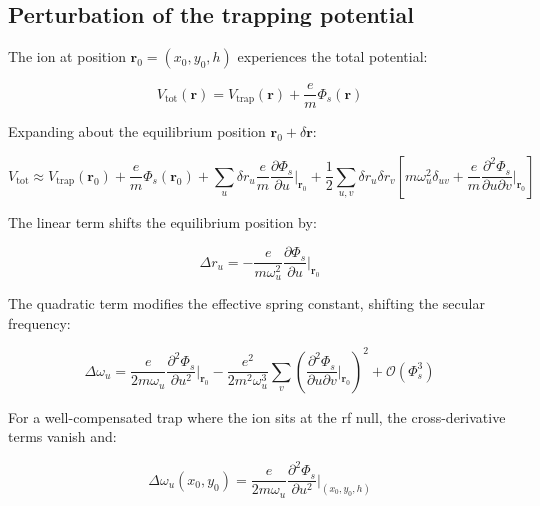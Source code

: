 \documentclass[11pt,a4paper]{article}
\begin{document}
\subsection{Perturbation of the trapping potential}

The ion at position $\mathbf{r}_0 = (x_0, y_0, h)$ experiences the total potential:

\begin{equation}
V_{\text{tot}}(\mathbf{r}) = V_{\text{trap}}(\mathbf{r}) + \frac{e}{m}\Phi_s(\mathbf{r})
\label{eq:total_potential}
\end{equation}

Expanding about the equilibrium position $\mathbf{r}_0 + \delta\mathbf{r}$:

\begin{equation}
V_{\text{tot}} \approx V_{\text{trap}}(\mathbf{r}_0) + \frac{e}{m}\Phi_s(\mathbf{r}_0)
    + \sum_u \delta r_u \frac{e}{m}\frac{\partial\Phi_s}{\partial u}\bigg|_{\mathbf{r}_0}
    + \frac{1}{2}\sum_{u,v} \delta r_u \delta r_v
        \left[m\omega_u^2\delta_{uv} + \frac{e}{m}\frac{\partial^2\Phi_s}{\partial u\partial v}\bigg|_{\mathbf{r}_0}\right]
\label{eq:taylor}
\end{equation}

The linear term shifts the equilibrium position by:

\begin{equation}
\Delta r_u = -\frac{e}{m\omega_u^2}\frac{\partial\Phi_s}{\partial u}\bigg|_{\mathbf{r}_0}
\label{eq:equilibrium_shift}
\end{equation}

The quadratic term modifies the effective spring constant, shifting the secular frequency:

\begin{equation}
\Delta\omega_u = \frac{e}{2m\omega_u}\frac{\partial^2\Phi_s}{\partial u^2}\bigg|_{\mathbf{r}_0}
    - \frac{e^2}{2m^2\omega_u^3}\sum_v
        \left(\frac{\partial^2\Phi_s}{\partial u\partial v}\bigg|_{\mathbf{r}_0}\right)^2
    + \mathcal{O}(\Phi_s^3)
\label{eq:frequency_shift_full}
\end{equation}

For a well-compensated trap where the ion sits at the rf null,
the cross-derivative terms vanish and:

\begin{equation}
\boxed{\Delta\omega_u(x_0,y_0) = \frac{e}{2m\omega_u}
    \frac{\partial^2\Phi_s}{\partial u^2}\bigg|_{(x_0,y_0,h)}}
\label{eq:freq_shift_simple}
\end{equation}
\end{document}
